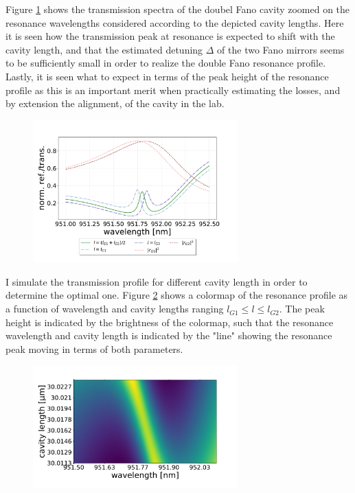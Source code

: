 Figure \ref{fig:G1_and_G2_short_range_spectra} shows the transmission spectra of the doubel Fano cavity zoomed on the resonance wavelengths considered according to the depicted cavity lengths. Here it is seen how the transmission peak at resonance is expected to shift with the cavity length, and that the estimated detuning $\Delta$ of the two Fano mirrors seems to be sufficiently small in order to realize the double Fano resonance profile. Lastly, it is seen what to expect in terms of the peak height of the resonance profile as this is an important merit when practically estimating the losses, and by extension the alignment, of the cavity in the lab. 

\begin{figure}[h!]
    \centering
    \includegraphics[width=0.7\textwidth]{figures/results/M3:M5/M3:M5_sim_spectra_short.pdf}
    \caption{}
    \label{fig:G1_and_G2_short_range_spectra}
\end{figure}

I simulate the transmission profile for different cavity length in order to determine the optimal one. Figure \ref{fig:G1_G2_cmap} shows a colormap of the resonance profile as a function of wavelength and cavity lengths ranging $l_{G1} \leq l \leq l_{G2}$. The peak height is indicated by the brightness of the colormap, such that the resonance wavelength and cavity length is indicated by the "line" showing the resonance peak moving in terms of both parameters. 

\begin{figure}[h!]
    \centering
    \includegraphics[width=0.7\textwidth]{figures/results/M3:M5/G1:G2_cmap.pdf}
    \caption{}
    \label{fig:G1_G2_cmap}
\end{figure}

